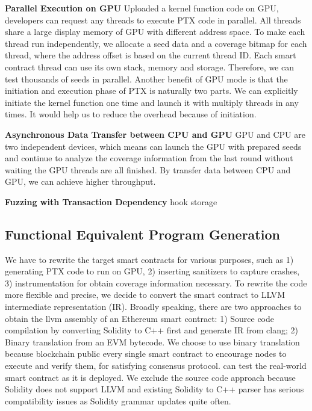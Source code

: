 \noindent \textbf{Parallel Execution on GPU}
Uploaded a kernel function code on GPU, developers can request any threads to execute PTX code in parallel.  
All threads share a large display memory of GPU with different address space. 
To make each thread run independently, we allocate
a seed data and a coverage bitmap for each thread, where the address offset is based on the current thread ID. Each smart contract thread can use its own stack, memory and storage. Therefore, we can test thousands of seeds in parallel. 
%
Another benefit of GPU mode is that the initiation and execution phase of PTX is naturally two parts. We can explicitly initiate the kernel function one time and launch it with multiply threads in any times. It would help us to reduce the overhead because of initiation\cite{cudaoverhead}.




\noindent \textbf{Asynchronous Data Transfer between CPU and GPU}
GPU and CPU are two independent devices, which means {\runner} can launch the GPU with prepared seeds and continue to analyze the coverage information from the last round without waiting the GPU threads are all finished. 
By transfer data between CPU and GPU, we can achieve higher throughput. 


\noindent \textbf{Fuzzing with Transaction Dependency}
hook storage


\subsection{Functional Equivalent Program Generation}

We have to rewrite the target smart contracts for various purposes, such as 1) generating PTX code to run on GPU, 2) inserting sanitizers to capture crashes, 3) instrumentation for obtain coverage information necessary. 
To rewrite the code more flexible and precise, we decide to convert the smart contract to LLVM intermediate representation (IR).  
%
Broadly speaking, there are two approaches to obtain the llvm assembly of an Ethereum smart contract: 1) Source code compilation by converting Solidity to C++ first and generate IR from clang\cite{}; 2) Binary translation from an EVM bytecode. 
We choose to use binary translation because blockchain public every single smart contract to encourage nodes to execute and verify them, for satisfying consensus protocol. {\tool} can test the real-world smart contract as it is deployed. 
We exclude the source code approach because Solidity does not support LLVM and existing Solidity to C++ parser has serious compatibility issues as Solidity grammar updates quite often. 


